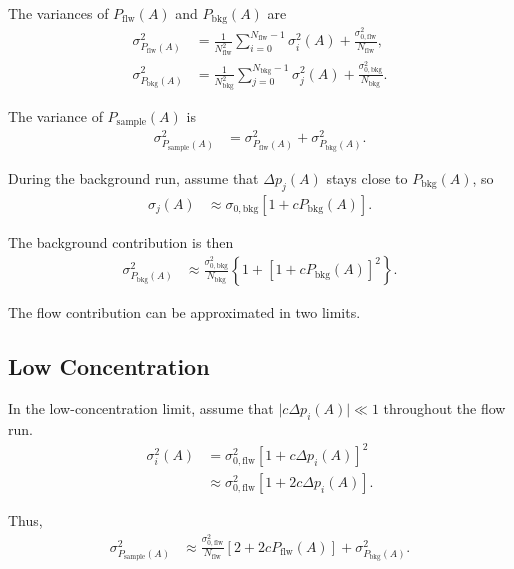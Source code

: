 \documentclass{article}
\begin{document}
The variances of $P_\mathrm{flw}(A)$ and $P_\mathrm{bkg}(A)$ are
\begin{align}
    \sigma^2_{P_\mathrm{flw}(A)} &= \frac{1}{N_\mathrm{flw}^2}\sum_{i=0}^{N_\mathrm{flw}-1}
        \sigma_i^2(A) + \frac{\sigma^2_{0,\mathrm{flw}}}{N_\mathrm{flw}}, \\
    \sigma^2_{P_\mathrm{bkg}(A)} &= \frac{1}{N_\mathrm{bkg}^2}\sum_{j=0}^{N_\mathrm{bkg}-1}
        \sigma_j^2(A) + \frac{\sigma^2_{0,\mathrm{bkg}}}{N_\mathrm{bkg}}.
\end{align}

The variance of $P_\mathrm{sample}(A)$ is
\begin{align}
    \sigma^2_{P_\mathrm{sample}(A)} &= \sigma^2_{P_\mathrm{flw}(A)} + \sigma^2_{P_\mathrm{bkg}(A)}.
\end{align}

\begin{keyidea}
    During the background run, assume that $\Delta p_j(A)$ stays close to $P_\mathrm{bkg}(A)$, so
    \begin{align}
        \sigma_j(A) &\approx \sigma_{0,\mathrm{bkg}}\left[1 + c P_\mathrm{bkg}(A)\right].
    \end{align}
\end{keyidea}

The background contribution is then
\begin{align}
    \sigma^2_{P_\mathrm{bkg}(A)} &\approx \frac{\sigma^2_{0,\mathrm{bkg}}}{N_\mathrm{bkg}}
        \left\{1 + \left[1 + c P_\mathrm{bkg}(A)\right]^2\right\}.
\end{align}

The flow contribution can be approximated in two limits.

\subsection{Low Concentration}

\begin{keyidea}
    In the low-concentration limit, assume that $\lvert c\Delta p_i(A)\rvert \ll 1$ throughout the flow run.
    \begin{align}
        \sigma_i^2(A) &= \sigma^2_{0,\mathrm{flw}}\left[1 + c\Delta p_i(A)\right]^2 \\
        &\approx \sigma^2_{0,\mathrm{flw}}\left[1 + 2c\Delta p_i(A)\right].
    \end{align}
\end{keyidea}

Thus,
\begin{align}
    \sigma^2_{P_\mathrm{sample}(A)} &\approx \frac{\sigma^2_{0,\mathrm{flw}}}{N_\mathrm{flw}}
        \left[2 + 2cP_\mathrm{flw}(A)\right] + \sigma^2_{P_\mathrm{bkg}(A)}.
\end{align}
\end{document}
